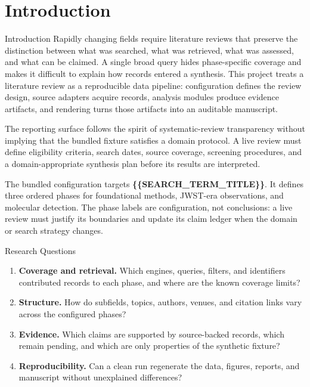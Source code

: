 \documentclass[
  ignorenonframetext,
]{beamer}
\author{}
\date{}
\providecommand{\tightlist}{%
  \setlength{\itemsep}{0pt}\setlength{\parskip}{0pt}}
\begin{document}
\section{Introduction}\label{introduction}

\begin{frame}[allowframebreaks]{Introduction}
Rapidly changing fields require literature reviews that preserve the
distinction between what was searched, what was retrieved, what was
assessed, and what can be claimed. A single broad query hides
phase-specific coverage and makes it difficult to explain how records
entered a synthesis. This project treats a literature review as a
reproducible data pipeline: configuration defines the review design,
source adapters acquire records, analysis modules produce evidence
artifacts, and rendering turns those artifacts into an auditable
manuscript.

The reporting surface follows the spirit of systematic-review
transparency  without implying that the bundled
fixture satisfies a domain protocol. A live review must define
eligibility criteria, search dates, source coverage, screening
procedures, and a domain-appropriate synthesis plan before its results
are interpreted.

The bundled configuration targets \textbf{\{\{SEARCH\_TERM\_TITLE\}\}}.
It defines three ordered phases for foundational methods, JWST-era
observations, and molecular detection. The phase labels are
configuration, not conclusions: a live review must justify its
boundaries and update its claim ledger when the domain or search
strategy changes.
\end{frame}

\begin{frame}[allowframebreaks]{Research Questions}
\label{research-questions}
\begin{enumerate}
\tightlist
\item
  \textbf{Coverage and retrieval.} Which engines, queries, filters, and
  identifiers contributed records to each phase, and where are the known
  coverage limits?
\item
  \textbf{Structure.} How do subfields, topics, authors, venues, and
  citation links vary across the configured phases?
\item
  \textbf{Evidence.} Which claims are supported by source-backed
  records, which remain pending, and which are only properties of the
  synthetic fixture?
\item
  \textbf{Reproducibility.} Can a clean run regenerate the data,
  figures, reports, and manuscript without unexplained differences?
\end{enumerate}
\end{frame}
\end{document}

